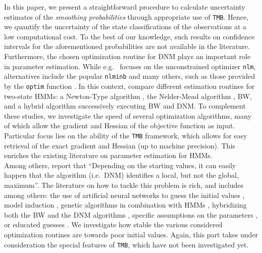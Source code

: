\documentclass[]{interact}\usepackage[]{graphicx}\usepackage[dvipsnames]{xcolor}
\theoremstyle{plain}%
\theoremstyle{definition}
\theoremstyle{remark}
\begin{document}
In this paper, we present a straightforward procedure to calculate uncertainty estimates of the \textit{smoothing probabilities} through appropriate use of {\tt{TMB}}. Hence, we quantify the uncertainty of the state classifications of the observations at a low computational cost. To the best of our knowledge, such results on confidence intervals for the aforementioned probabilities are not available in the literature.\\
Furthermore, the chosen optimization routine for DNM plays an important role in parameter estimation. While e.g.~\cite{zucchini} focuses on the unconstrained optimizer \texttt{nlm}, alternatives include the popular \texttt{nlminb} \citep{gay} and many others, such as those provided by the \texttt{optim} function \citep{R-optimr}. In this context, \cite{bulla} compare different estimation routines for two-state HMMs: a Newton-Type algorithm \citep{dennis, schnabel}, the Nelder-Mead algorithm \citep{nelder}, BW, and a hybrid algorithm successively executing BW and DNM.
To complement these studies, we investigate the speed of several optimization algorithms, many of which allow the gradient and Hessian of the objective function as input. Particular focus lies on the ability of the {\tt{TMB}} framework, which allows for easy retrieval of the exact gradient and Hessian (up to machine precision). This enriches the existing literature on parameter estimation for HMMs.\\
Among others, \cite{zucchini} report that ``Depending on the starting values, it can easily happen that the algorithm (i.e.~DNM) identifies a local, but not the global, maximum''. The literature on how to tackle this problem is rich, and includes among others: the use of artificial neural networks to guess the initial values \citep{hassan}, model induction \citep{stolcke}, genetic algorithms in combination with HMMs \citep{oudelha}, hybridizing both the BW and the DNM algorithms \citep{redner, lange, bulla}, specific assumptions on the parameters \citep{kato}, or educated guesses \citep[p. ~53]{zucchini}. We investigate how stable the various considered optimization routines are towards poor initial values. Again, this part takes under consideration the special features of {\tt{TMB}}, which have not been investigated yet.
\end{document}
